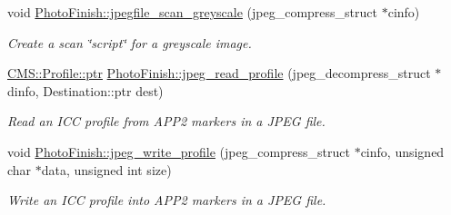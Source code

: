\begin{DoxyCompactItemize}
void \hyperlink{namespace_photo_finish_aeb3ed185a3672cf727f112889c7320d5}{Photo\+Finish\+::jpegfile\+\_\+scan\+\_\+greyscale} (jpeg\+\_\+compress\+\_\+struct $\ast$cinfo)
\begin{DoxyCompactList}\small\item\em Create a scan \char`\"{}script\char`\"{} for a greyscale image. \end{DoxyCompactList}\item 
\hyperlink{class_c_m_s_1_1_profile_a7d5a80e1317d17dbfdf5ae69820ab08b}{C\+M\+S\+::\+Profile\+::ptr} \hyperlink{namespace_photo_finish_a646def5a531d0c79b58c5a8ca485837b}{Photo\+Finish\+::jpeg\+\_\+read\+\_\+profile} (jpeg\+\_\+decompress\+\_\+struct $\ast$dinfo, Destination\+::ptr dest)
\begin{DoxyCompactList}\small\item\em Read an I\+CC profile from A\+P\+P2 markers in a J\+P\+EG file. \end{DoxyCompactList}\item 
void \hyperlink{namespace_photo_finish_a0437f142c40159470e827e79c20f6d59}{Photo\+Finish\+::jpeg\+\_\+write\+\_\+profile} (jpeg\+\_\+compress\+\_\+struct $\ast$cinfo, unsigned char $\ast$data, unsigned int size)
\begin{DoxyCompactList}\small\item\em Write an I\+CC profile into A\+P\+P2 markers in a J\+P\+EG file. \end{DoxyCompactList}\end{DoxyCompactItemize}
